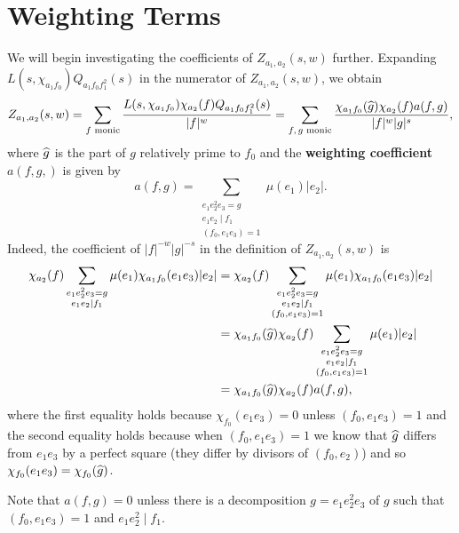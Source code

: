 \documentclass[12pt,reqno,oneside]{amsart}
\begin{document}
\section{Weighting Terms}
    We will begin investigating the coefficients of $Z_{a_{1},a_{2}}(s,w)$ further. Expanding $L(s,\chi_{a_{1}f_{0}})Q_{a_{1}f_{0}f_{1}^{2}}(s)$ in the numerator of $Z_{a_{1},a_{2}}(s,w)$, we obtain
    \[
        Z_{a_{1},a_{2}}(s,w) = \sum_{\text{$f$ monic}}\frac{L(s,\chi_{a_{1}f_{0}})\chi_{a_{2}}(f)Q_{a_{1}f_{0}f_{1}^{2}}(s)}{|f|^{w}} = \sum_{\text{$f,g$ monic}}\frac{\chi_{a_{1}f_{0}}(\widehat{g})\chi_{a_{2}}(f)a(f,g)}{|f|^{w}|g|^{s}},
    \]
    where $\widehat{g}$ is the part of $g$ relatively prime to $f_{0}$ and the \textbf{weighting coefficient} $a(f,g,)$ is given by
    \[
        a(f,g) = \sum_{\substack{e_{1}e_{2}^{2}e_{3} = g \\ e_{1}e_{2} \mid f_{1} \\ (f_{0},e_{1}e_{3}) = 1}}\mu(e_{1})|e_{2}|.
    \]
    Indeed, the coefficient of $|f|^{-w}|g|^{-s}$ in the definition of $Z_{a_{1},a_{2}}(s,w)$ is
    \begin{align*}
        \chi_{a_{2}}(f)\sum_{\substack{e_{1}e_{2}^{2}e_{3} = g \\ e_{1}e_{2} \mid f_{1}}}\mu(e_{1})\chi_{a_{1}f_{0}}(e_{1}e_{3})|e_{2}| &= \chi_{a_{2}}(f)\sum_{\substack{e_{1}e_{2}^{2}e_{3} = g \\ e_{1}e_{2} \mid f_{1} \\ (f_{0},e_{1}e_{3}) = 1}}\mu(e_{1})\chi_{a_{1}f_{0}}(e_{1}e_{3})|e_{2}| \\
        &= \chi_{a_{1}f_{0}}(\widehat{g})\chi_{a_{2}}(f)\sum_{\substack{e_{1}e_{2}^{2}e_{3} = g \\ e_{1}e_{2} \mid f_{1} \\ (f_{0},e_{1}e_{3}) = 1}}\mu(e_{1})|e_{2}| \\
        &= \chi_{a_{1}f_{0}}(\widehat{g})\chi_{a_{2}}(f)a(f,g),
    \end{align*}
    where the first equality holds because $\chi_{f_{0}}(e_{1}e_{3}) = 0$ unless $(f_{0},e_{1}e_{3}) = 1$ and the second equality holds because when $(f_{0},e_{1}e_{3}) = 1$ we know that $\widehat{g}$ differs from $e_{1}e_{3}$ by a perfect square (they differ by divisors of $(f_{0},e_{2})$) and so $\chi_{f_{0}}(e_{1}e_{3}) = \chi_{f_{0}}(\widehat{g})$. 
    
    \begin{remark}\label{rem:weighting_coefficient_remark}
        Note that $a(f,g) = 0$ unless there is a decomposition $g = e_{1}e_{2}^{2}e_{3}$ of $g$ such that $(f_{0},e_{1}e_{3}) = 1$ and $e_{1}e_{2}^{2} \mid f_{1}$.
    \end{remark}
\end{document}
